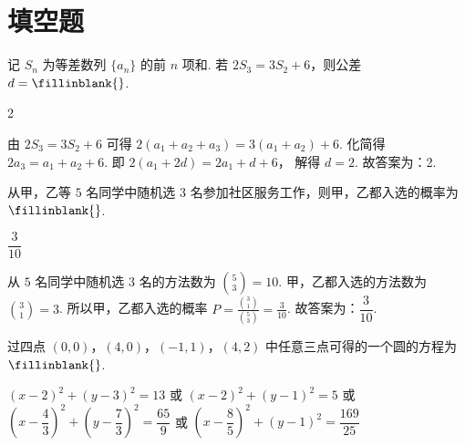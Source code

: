 \section{填空题}

\begin{problem}
记 \(S_n\) 为等差数列 \(\{a_n\}\) 的前 \(n\) 项和. 若 \(2S_3=3S_2+6\)，则公差 \(d=\fillinblank{}\).
\end{problem}

\begin{answer}
2
\end{answer}

\begin{solution}
由
\(2S_3=3S_2+6\)
可得
\(2(a_1+a_2+a_3)=3(a_1+a_2)+6\).
化简得
\(2a_3=a_1+a_2+6\).
即
\(2(a_1+2d)=2a_1+d+6\)，
解得
\(d=2\).
故答案为：2.
\end{solution}

\begin{problem}
从甲，乙等 \(5\) 名同学中随机选 \(3\) 名参加社区服务工作，则甲，乙都入选的概率为 \(\fillinblank{}\).
\end{problem}

\begin{answer}
\(\dfrac{3}{10}\)
\end{answer}

\begin{solution}
从 \(5\) 名同学中随机选 \(3\) 名的方法数为
\(\binom{5}{3}=10\).
甲，乙都入选的方法数为
\(\binom{3}{1}=3\).
所以甲，乙都入选的概率
\(P=\frac{\binom{3}{1}}{\binom{5}{3}}=\frac{3}{10}\).
故答案为：\(\dfrac{3}{10}\).
\end{solution}

\begin{problem}
过四点 \((0,0)\)，\((4,0)\)，\((-1,1)\)，\((4,2)\) 中任意三点可得的一个圆的方程为 \(\fillinblank{}\).
\end{problem}

\begin{answer}
\((x-2)^2+(y-3)^2=13\) 或 \((x-2)^2+(y-1)^2=5\) 或 \(\left(x-\dfrac{4}{3}\right)^2+\left(y-\dfrac{7}{3}\right)^2=\dfrac{65}{9}\) 或 \(\left(x-\dfrac{8}{5}\right)^2+(y-1)^2=\dfrac{169}{25}\)
\end{answer}

